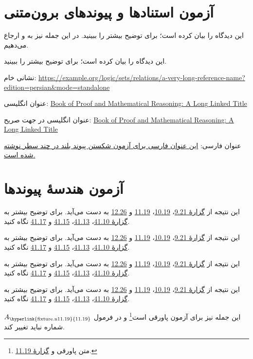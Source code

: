 \documentclass[14pt,oneside,openany]{memoir}
\newcommand{\GRef}[1]{\hyperlink{fixture.n#1}{#1}}
\newcommand{\GNamedRef}[1]{\hyperlink{fixture.n#1}{گزارهٔ #1}}
\newcommand{\GList}{\GNamedRef{9.21}، \GRef{10.19}، \GRef{11.19} و \GRef{12.26}}
\newcommand{\GSample}[1]{%
  \par\noindent\begin{minipage}{#1}\raggedleft
  این نتیجه از \GList{} به دست می‌آید. برای توضیح بیشتر به \GNamedRef{41.10}،
  \GRef{41.13}، \GRef{41.15} و \GRef{41.17} نگاه کنید.
  \end{minipage}\par\medskip}
\begin{document}
\chapter*{آزمون استنادها و پیوندهای برون‌متنی}
\noindent\begin{minipage}{468pt}\raggedleft
این دیدگاه را \citet{Cantor1892} بیان کرده است؛ برای توضیح بیشتر
\citep{Frege1884,Benacerraf1965,Magnus2021} را ببینید.
در این جمله نیز به \citet{Solow2013} و \citet{Hammack2013} ارجاع می‌دهیم.
\end{minipage}\par\medskip
\noindent\begin{minipage}{190pt}\raggedleft
این دیدگاه را \citet{Cantor1892} بیان کرده است؛ برای توضیح بیشتر
\citep{Frege1884,Benacerraf1965,Magnus2021} را ببینید.
\end{minipage}\par\bigskip
\noindent\begin{minipage}{260pt}\raggedleft
نشانی خام:
\url{https://example.org/logic/sets/relations/a-very-long-reference-name?edition=persian&mode=standalone}
\par عنوان انگلیسی:
\href{https://example.org/book-of-proof}{Book of Proof and Mathematical Reasoning: A Long Linked Title}
\par عنوان انگلیسی در جهت صریح:
\foreignlanguage{english}{\href{https://example.org/explicit-ltr-title}{Book of Proof and Mathematical Reasoning: A Long Linked Title}}
\par عنوان فارسی:
\href{https://example.org/persian-title}{این عنوان فارسی برای آزمون شکستن پیوند بلند در چند سطر نوشته شده است.}
\end{minipage}
\newpage
\endgroup
\begingroup
{}

\chapter*{آزمون هندسهٔ پیوندها}
\noindent{}\par
\GSample{468pt}\GSample{350pt}\GSample{260pt}\GSample{190pt}
\noindent این جمله نیز برای آزمون پاورقی است\footnote{متن پاورقی و \GNamedRef{11.19}.}
و در فرمول \(A_{\text{\GRef{11.19}}}\) شماره نباید تغییر کند.
\newpage
\end{document}
